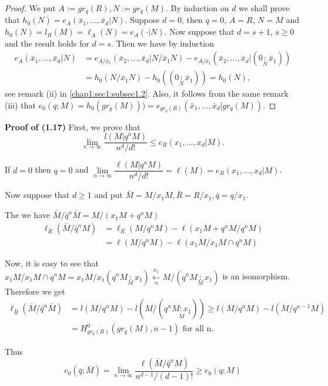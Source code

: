 \begin{proof}
  We put $A:=gr_q(R), N:=gr_q(M)$. By induction on $d$ we shall prove
  that $h_0(N)=e_A(\bar{x}_1, \ldots, \bar{x}_d|N)$. Suppose $d=0$,
 then $q=0$, $A=R$,  $N=M$ and $h_0(N)=l_R(M)=\ell_A(N)=e_A(\cdot|N)$. Now suppose that
  $d=s+1$, $s \geq 0$ and the result holds for $d=s$. Then we have by
  induction 
  \begin{align*}
    e_A(\bar{x}_1, \ldots,
    \bar{x}_d|N)& =e_{A/\bar{x}_1}(\bar{x}_2, \ldots, \bar{x}_d|N/\bar{x}_1
    N)-e_{A/\bar{x}_1}(\bar{x}_2, \ldots, \bar{x}_d|(0 \underset{N}:
    \bar{x}_1))\\  
    & =h_0(N/\bar{x}_1N)-h_0((0\underset{N}:
    \bar{x}_1))=h_0(N), 
  \end{align*}
  see remark (ii) in \ref{chap1:sec1:subsec1.2}. Also, it follows from
  the same remark (iii) that
  $e_0(q;M)=h_0(gr_g(M)))=e_{gr_q(R)}(\bar{x}_1, \ldots,
  \bar{x}_d|gr_q(M))$.  
\end{proof}

\noindent \textbf{Proof of (1.17)}
  First, we prove that
  $$
  \lim_{n \to \infty}\frac{l(M|q^n M)}{n^d/d!}\leq e_R(x_1, \ldots, x_d|M). 
  $$

  If $d=0$ then $q=0$ and $\lim\limits_{n \to \infty}\dfrac{\ell
    (M|q^nM)}{n^d/d!}=\ell (M)= e_R(x_1, \ldots, x_d|M)$.  

Now suppose that $d \geq 1$ and put $\bar{M}=M/x_1M, \bar{R}=R/x_1,
\bar{q}=q/x_1$.  

The we have $\bar{M}/\bar{q}^n \bar{M}= M/(x_1M+q^n M)$
\begin{align*}
  \ell_{\bar{R}}(\bar{M}/\bar{q}^n M) &=\ell_{\bar{R}} (M/q^nM)-\ell
  (x_1M+q^nM/q^nM)\\ 
  & =\ell (M/q^nM)-\ell (x_1 M/x_1M \cap q^nM) 
\end{align*}

Now, it is easy to see that $x_1M/x_1M \cap q^nM=x_1M/x_1(q^n M
\underset{M}: x_1) \xleftarrow[\approx]{x_1} M/(q^n M \underset{M}:
x_1)$ is an isomorphism. Therefore we get  
{\fontsize{10pt}{12pt}\selectfont
\begin{align*}
  \ell	_{\bar{R}}(\bar{M}/\bar{q}^n \bar{M})& =
  l(M/q^nM)-l(M/(q^n\underset{M}{ M: x_1})) \geq l (M/q^{n}M)- l
  (M/q^{n-1}M)\\
  &= H^0_{gr_q(R)}(gr_q(M), n-1)\text{ for all n}. 
\end{align*}}\relax\pageoriginale

Thus
$$
e_0(\bar{q};\bar{M})=\lim_{n \to \infty} \frac{\ell (\bar{M}/\bar{q}^n
  M)}{n^{d-1}/(d-1)!}\geq e_0(q;M)  
$$

